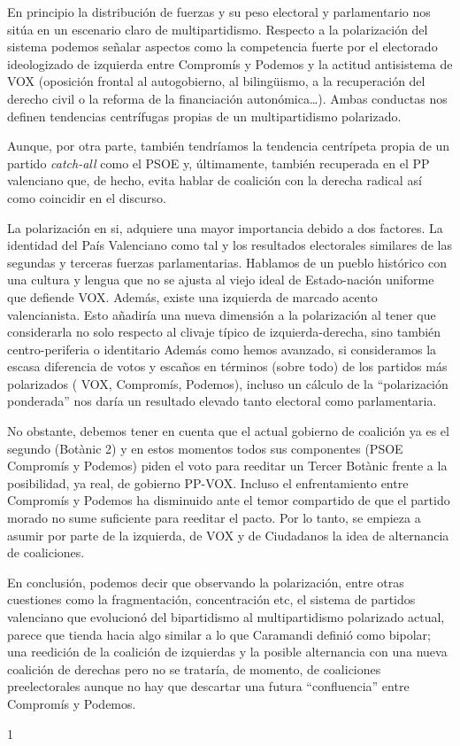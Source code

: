 \documentclass[
]{article}
\begin{document}
En principio la distribución de fuerzas y su peso electoral y
parlamentario nos sitúa en un escenario claro de multipartidismo.
Respecto a la polarización del sistema podemos señalar aspectos como la
competencia fuerte por el electorado ideologizado de izquierda entre
Compromís y Podemos y la actitud antisistema de VOX (oposición frontal
al autogobierno, al bilingüismo, a la recuperación del derecho civil o
la reforma de la financiación autonómica\ldots). Ambas conductas nos
definen tendencias centrífugas propias de un multipartidismo polarizado.

Aunque, por otra parte, también tendríamos la tendencia centrípeta
propia de un partido \emph{catch-all} como el PSOE y, últimamente,
también recuperada en el PP valenciano que, de hecho, evita hablar de
coalición con la derecha radical así como coincidir en el discurso.

La polarización en si, adquiere una mayor importancia debido a dos
factores. La identidad del País Valenciano como tal y los resultados
electorales similares de las segundas y terceras fuerzas parlamentarias.
Hablamos de un pueblo histórico con una cultura y lengua que no se
ajusta al viejo ideal de Estado-nación uniforme que defiende VOX.
Además, existe una izquierda de marcado acento valencianista. Esto
añadiría una nueva dimensión a la polarización al tener que considerarla
no solo respecto al clivaje típico de izquierda-derecha, sino también
centro-periferia o identitario Además como hemos avanzado, si
consideramos la escasa diferencia de votos y escaños en términos (sobre
todo) de los partidos más polarizados ( VOX, Compromís, Podemos),
incluso un cálculo de la ``polarización ponderada'' nos daría un
resultado elevado tanto electoral como parlamentaria.

No obstante, debemos tener en cuenta que el actual gobierno de coalición
ya es el segundo (Botànic 2) y en estos momentos todos sus componentes
(PSOE Compromís y Podemos) piden el voto para reeditar un Tercer Botànic
frente a la posibilidad, ya real, de gobierno PP-VOX. Incluso el
enfrentamiento entre Compromís y Podemos ha disminuido ante el temor
compartido de que el partido morado no sume suficiente para reeditar el
pacto. Por lo tanto, se empieza a asumir por parte de la izquierda, de
VOX y de Ciudadanos la idea de alternancia de coaliciones.

En conclusión, podemos decir que observando la polarización, entre otras
cuestiones como la fragmentación, concentración etc, el sistema de
partidos valenciano que evolucionó del bipartidismo al multipartidismo
polarizado actual, parece que tienda hacia algo similar a lo que
Caramandi definió como bipolar; una reedición de la coalición de
izquierdas y la posible alternancia con una nueva coalición de derechas
pero no se trataría, de momento, de coaliciones preelectorales aunque no
hay que descartar una futura ``confluencia'' entre Compromís y Podemos.

1
\end{document}

